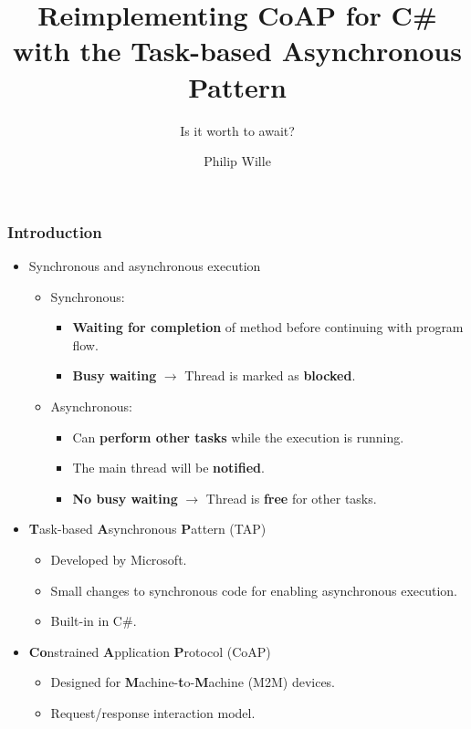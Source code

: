 \documentclass[11pt,t,usepdftitle=false,aspectratio=169,usenames,dvipsnames]{beamer}
\title{Reimplementing CoAP for C\# with the Task-based Asynchronous Pattern}
\subtitle{Is it worth to await?}
\author{Philip Wille}
\begin{document}
    \maketitle{}

    \begin{frame}
        \frametitle{Introduction}
        \begin{itemize}
            \item<1-> Synchronous and asynchronous execution
            \begin{itemize}
                \item<2-> Synchronous:
                \begin{itemize}
                    \item<3-> \textcolor{uibkBlue}{\textbf{Waiting for completion}} of method before continuing with program flow.
                    \item<5-> \textcolor{uibkBlue}{\textbf{Busy waiting}} $\rightarrow$ Thread is marked as \textcolor{uibkBlue}{\textbf{blocked}}.
                \end{itemize}
                \item<2-> Asynchronous:
                \begin{itemize}
                    \item<4-> Can \textcolor{uibkBlue}{\textbf{perform other tasks}} while the execution is running.
                    \item<6-> The main thread will be \textcolor{uibkBlue}{\textbf{notified}}.
                    \item<7-> \textcolor{uibkBlue}{\textbf{No busy waiting}} $\rightarrow$ Thread is \textcolor{uibkBlue}{\textbf{free}} for other tasks.
                \end{itemize}
            \end{itemize}
            \item<8-> \textcolor{uibkBlue}{\textbf{T}}ask-based \textcolor{uibkBlue}{\textbf{A}}synchronous \textcolor{uibkBlue}{\textbf{P}}attern (TAP)
            \begin{itemize}
                \item<9-> Developed by Microsoft.
                \item<10-> Small changes to synchronous code for enabling asynchronous execution.
                \item<11-> Built-in in C\#.
            \end{itemize}
            \item<12-> \textcolor{uibkBlue}{\textbf{Co}}nstrained \textcolor{uibkBlue}{\textbf{A}}pplication \textcolor{uibkBlue}{\textbf{P}}rotocol (CoAP)
            \begin{itemize}
                \item<13-> Designed for \textcolor{uibkBlue}{\textbf{M}}achine-\textcolor{uibkBlue}{\textbf{t}}o-\textcolor{uibkBlue}{\textbf{M}}achine (M2M) devices.
                \item<14-> Request/response interaction model.
            \end{itemize}
        \end{itemize}
    \end{frame}
\end{document}
